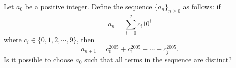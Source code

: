 Let $a_0$ be a positive integer. Define the sequence $\{a_n\}_{n \geq 0}$ as follows: if \[ a_n = \sum_{i = 0}^jc_i10^i \] where $c_i \in \{0,1,2,\cdots,9\}$,  then \[ a_{n + 1} = c_0^{2005} + c_1^{2005} + \cdots + c_j^{2005}. \] Is it possible to choose $a_0$ such that all terms in the sequence are distinct?
